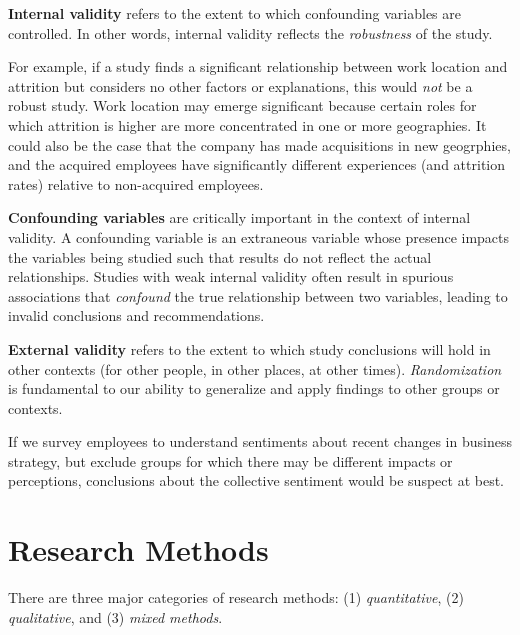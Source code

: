 \documentclass[]{book}
\begin{document}
\textbf{Internal validity} refers to the extent to which confounding variables are controlled. In other words, internal validity reflects the \emph{robustness} of the study.

For example, if a study finds a significant relationship between work location and attrition but considers no other factors or explanations, this would \emph{not} be a robust study. Work location may emerge significant because certain roles for which attrition is higher are more concentrated in one or more geographies. It could also be the case that the company has made acquisitions in new geogrphies, and the acquired employees have significantly different experiences (and attrition rates) relative to non-acquired employees.

\textbf{Confounding variables} are critically important in the context of internal validity. A confounding variable is an extraneous variable whose presence impacts the variables being studied such that results do not reflect the actual relationships. Studies with weak internal validity often result in spurious associations that \emph{confound} the true relationship between two variables, leading to invalid conclusions and recommendations.

\textbf{External validity} refers to the extent to which study conclusions will hold in other contexts (for other people, in other places, at other times). \emph{Randomization} is fundamental to our ability to generalize and apply findings to other groups or contexts.

If we survey employees to understand sentiments about recent changes in business strategy, but exclude groups for which there may be different impacts or perceptions, conclusions about the collective sentiment would be suspect at best.

\hypertarget{research-methods}{%
\section{Research Methods}\label{research-methods}}

There are three major categories of research methods: (1) \emph{quantitative}, (2) \emph{qualitative}, and (3) \emph{mixed methods}.
\end{document}
